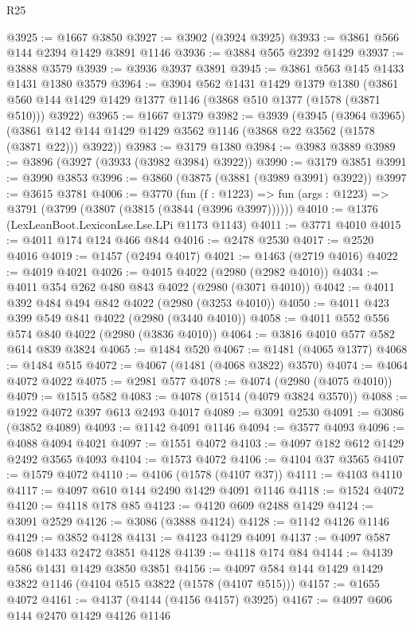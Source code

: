 \begin{lexlean}{R25}
\begin{coremodule}
@3925 := @1667 @3850
@3927 := @3902 (@3924 @3925)
@3933 := @3861 @566 @144 @2394 @1429 @3891 @1146
@3936 := @3884 @565 @2392 @1429
@3937 := @3888 @3579
@3939 := @3936 @3937 @3891
@3945 := @3861 @563 @145 @1433 @1431 @1380 @3579
@3964 := @3904
    @562
    @1431
    @1429
    @1379
    @1380
    (@3861 @560 @144 @1429 @1429 @1377 @1146 (@3868 @510 @1377 (@1578 (@3871 @510))) @3922)
@3965 := @1667 @1379
@3982 := @3939
    (@3945
      (@3964 @3965)
      (@3861 @142 @144 @1429 @1429 @3562 @1146 (@3868 @22 @3562 (@1578 (@3871 @22))) @3922))
@3983 := @3179 @1380
@3984 := @3983 @3889
@3989 := @3896 (@3927 (@3933 (@3982 @3984) @3922))
@3990 := @3179 @3851
@3991 := @3990 @3853
@3996 := @3860 (@3875 (@3881 (@3989 @3991) @3922))
@3997 := @3615 @3781
@4006 := @3770
    (fun (f : @1223) => fun (args : @1223) => @3791 (@3799 (@3807 (@3815 (@3844 (@3996 @3997))))))
@4010 := @1376 (LexLeanBoot.LexiconLse.Lse.LPi @1173 @1143)
@4011 := @3771 @4010
@4015 := @4011 @174 @124 @466 @844
@4016 := @2478 @2530
@4017 := @2520 @4016
@4019 := @1457 (@2494 @4017)
@4021 := @1463 (@2719 @4016)
@4022 := @4019 @4021
@4026 := @4015 @4022 (@2980 (@2982 @4010))
@4034 := @4011 @354 @262 @480 @843 @4022 (@2980 (@3071 @4010))
@4042 := @4011 @392 @484 @494 @842 @4022 (@2980 (@3253 @4010))
@4050 := @4011 @423 @399 @549 @841 @4022 (@2980 (@3440 @4010))
@4058 := @4011 @552 @556 @574 @840 @4022 (@2980 (@3836 @4010))
@4064 := @3816 @4010 @577 @582 @614 @839 @3824
@4065 := @1484 @520
@4067 := @1481 (@4065 @1377)
@4068 := @1484 @515
@4072 := @4067 (@1481 (@4068 @3822) @3570)
@4074 := @4064 @4072 @4022
@4075 := @2981 @577
@4078 := @4074 (@2980 (@4075 @4010))
@4079 := @1515 @582
@4083 := @4078 (@1514 (@4079 @3824 @3570))
@4088 := @1922 @4072 @397 @613 @2493 @4017
@4089 := @3091 @2530
@4091 := @3086 (@3852 @4089)
@4093 := @1142 @4091 @1146
@4094 := @3577 @4093
@4096 := @4088 @4094 @4021
@4097 := @1551 @4072
@4103 := @4097 @182 @612 @1429 @2492 @3565 @4093
@4104 := @1573 @4072
@4106 := @4104 @37 @3565
@4107 := @1579 @4072
@4110 := @4106 (@1578 (@4107 @37))
@4111 := @4103 @4110
@4117 := @4097 @610 @144 @2490 @1429 @4091 @1146
@4118 := @1524 @4072
@4120 := @4118 @178 @85
@4123 := @4120 @609 @2488 @1429
@4124 := @3091 @2529
@4126 := @3086 (@3888 @4124)
@4128 := @1142 @4126 @1146
@4129 := @3852 @4128
@4131 := @4123 @4129 @4091
@4137 := @4097 @587 @608 @1433 @2472 @3851 @4128
@4139 := @4118 @174 @84
@4144 := @4139 @586 @1431 @1429 @3850 @3851
@4156 := @4097 @584 @144 @1429 @1429 @3822 @1146 (@4104 @515 @3822 (@1578 (@4107 @515)))
@4157 := @1655 @4072
@4161 := @4137 (@4144 (@4156 @4157) @3925)
@4167 := @4097 @606 @144 @2470 @1429 @4126 @1146

\end{coremodule}
\end{lexlean}
